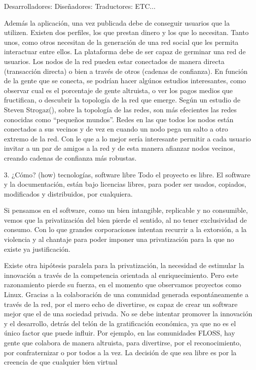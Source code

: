 Desarrolladores:
Diseñadores:
Traductores:
ETC...

Además la aplicación, una vez publicada debe de conseguir usuarios que la utilizen. Existen dos perfiles, los que prestan dinero y los que lo necesitan. Tanto unos, como otros necesitan de la generación de una red social que les permita interactuar entre ellos. La plataforma debe de ser capaz de germinar una red de usuarios. Los nodos de la red pueden estar conectados de manera directa (transacción directa) o bien a través de otros (cadenas de confianza). En función de la gente que se conecta, se podrían hacer algúnos estudios interesantes, como observar cual es el porcentaje de gente altruista, o ver los pagos medios que fructifican, o descubrir la topología de la red que emerge. Según un estudio de Steven Strogaz(), sobre la topología de las redes, son más efecientes las redes conocidas como ``pequeños mundos''. Redes en las que todos los nodos están conectados a sus vecinos y de vez en cuando un nodo pega un salto a otro extremo de la red. Con le que a lo mejor sería interesante permitir a cada usuario invitar a un par de amigos a la red y de esta manera afianzar nodos vecinos, creando cadenas de confianza más robustas.


3. ¿Cómo? (how)
tecnologías, software libre
Todo el proyecto es libre. El software y la documentación, están bajo licencias libres, para poder ser usados, copiados, modificados y distribuidos, por cualquiera.

Si pensamos en el software, como un bien intangible, replicable y no consumible, vemos que la privatización del bien pierde el sentido, al no tener exclusividad de consumo. Con lo que grandes corporaciones intentan recurrir a la extorsión, a la violencia y al chantaje para poder imponer una privatización para la que no existe ya justificación. \cite{Bifo Cap. Fraternidad, saber, no saber}

Existe otra hipótesis paralela para la privatización, la necesidad de estimular la innovación a través de la competencia orientada al enriquecimiento. Pero este razonamiento pierde su fuerza, en el momento que observamos proyectos como Linux. Gracias a la colaboración de una comunidad generada espontáneamente a través de la red, por el mero echo de divertirse, es capaz de crear un software mejor que el de una sociedad privada. No se debe intentar promover la innovación y el desarrollo, detrás del telón de la gratificación económica, ya que no es el único factor que puede influir. Por ejemplo, en las comunidades FLOSS, hay gente que colabora de manera altruista, para divertirse, por el reconocimiento, por confraternizar o por todos a la vez. \cite{Bifo Cap. Fraternidad, saber, no saber}
La decisión de que sea libre es por la creencia de que cualquier bien virtual

